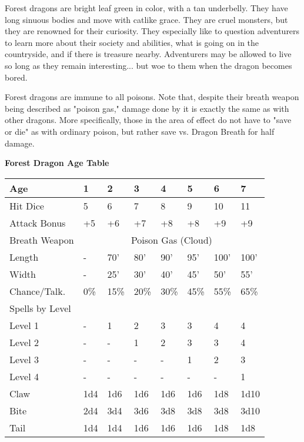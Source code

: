 \documentclass[a4paper,twoside,openany,10pt]{book}
\begin{document}
\begin{multicols}{2}
Forest dragons are bright leaf green in color, with a tan underbelly. They have long sinuous bodies and move with catlike grace. They are cruel monsters, but they are renowned for their curiosity. They especially like to question adventurers to learn more about their society and abilities, what is going on in the countryside, and if there is treasure nearby. Adventurers may be allowed to live so long as they remain interesting... but woe to them when the dragon becomes bored.

Forest dragons are immune to all poisons. Note that, despite their breath weapon being described as "poison gas," damage done by it is exactly the same as with other dragons. More specifically, those in the area of effect do not have to "save or die" as with ordinary poison, but rather save vs. Dragon Breath for half damage.\\

\begin{center}
	\textbf{Forest Dragon Age Table}\\
	
\begin{tabularx}{0.47\textwidth}{@{}lXXXXXXX@{}}
Age & 1 & 2 & 3 & 4 & 5 & 6 & 7 \\\hline
Hit Dice & 5 & 6 & 7 & 8 & 9 & 10 & 11 \\\hline
Attack Bonus & +5 & +6 & +7 & +8 & +8 & +9 & +9 \\\hline
Breath Weapon&  \multicolumn{7}{c}{Poison Gas (Cloud)}\\\hline
Length & - & 70' & 80' & 90' & 95' & 100' & 100' \\\hline
Width & - & 25' & 30' & 40' & 45' & 50' & 55' \\\hline
Chance/Talk.  & 0\% & 15\% & 20\% & 30\% & 45\% & 55\% & 65\% \\\hline
Spells by Level &&&&&&&\\\hline
Level 1 & - & 1 & 2 & 3 & 3 & 4 & 4 \\\hline
Level 2 & - & - & 1 & 2 & 3 & 3 & 4 \\\hline
Level 3 & - & - & - & - & 1 & 2 & 3 \\\hline
Level 4 & - & - & - & - & - & - & 1 \\\hline
Claw & 1d4 & 1d6 & 1d6 & 1d6 & 1d6 & 1d8 & 1d10 \\\hline
Bite & 2d4 & 3d4 & 3d6 & 3d8 & 3d8 & 3d8 & 3d10 \\\hline
Tail & 1d4 & 1d4 & 1d6 & 1d6 & 1d6 & 1d8 & 1d8 \\\hline
\end{tabularx}
\end{center}


\end{multicols}
\end{document}
